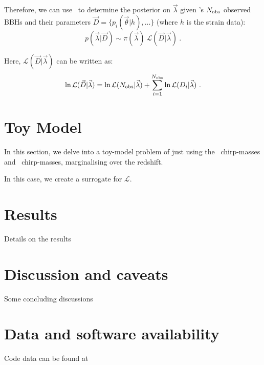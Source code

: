 \documentclass[floatfix,ApJL,twocolumn]{aastex631}
\begin{document}
Therefore, we can use \compas\ to determine the posterior on $\vec{\lambda}$ given \lvk's $N_{\rm obs}$ observed BBHs and their parameters $\vec{D} = \{ p_i(\vec{\theta}|h), ...\}$ (where $h$ is the strain data):
\begin{equation}
    p(\vec{\lambda}| \vec{D}) \sim \pi(\vec{\lambda})\ \mathcal{L}(\vec{D}| \vec{\lambda})\ .
\end{equation}


Here, $\mathcal{L}(\vec{D}| \vec{\lambda})$ can be written as:
\begin{equation}
    \ln \mathcal{L}(\vec{D}| \vec{\lambda}) = \ln \mathcal{L}(N_{\rm obs}|\vec{\lambda}) + \sum^{N_{\rm obs}}_{i=1} \ln \mathcal{L}(D_i|\vec{\lambda}) \ .
\end{equation}







\section{Toy Model}

In this section, we delve into a toy-model problem of just using the \lvk\ chirp-masses and \compas\ chirp-masses, marginalising over the redshift.

In this case, we create a surrogate for $\mathcal{L}$.





\section{Results}\label{sec:results}
Details on the results

\section{Discussion and caveats}\label{sec:conclusion}
Some concluding discussions

\section{Data and software availability}\label{sec:data}
Code data can be found at \projectGit



\end{document}
